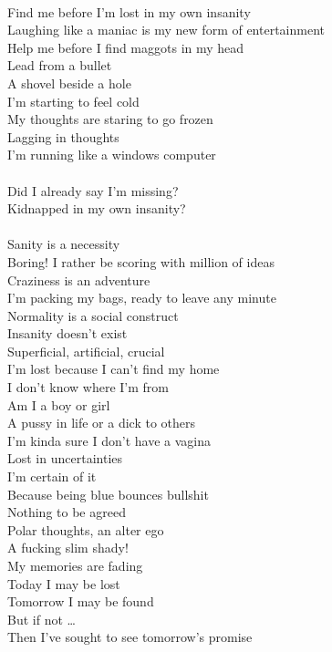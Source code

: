 \documentclass[12pt, b5paper, oneside]{book}
\begin{document}
\\Find me before I'm lost in my own insanity
\\Laughing like a maniac is my new form of entertainment
\\Help me before I find maggots in my head
\\Lead from a bullet
\\A shovel beside a hole
\\I'm starting to feel cold
\\My thoughts are staring to go frozen
\\Lagging in thoughts
\\I'm running like a windows computer
%
\\\\Did I already say I'm missing?
\\Kidnapped in my own insanity?
%
\\\\Sanity is a necessity
\\Boring! I rather be scoring with million of ideas
\\Craziness is an adventure
\\I'm packing my bags, ready to leave any minute
\\Normality is a social construct
\\Insanity doesn't exist
\\Superficial, artificial, crucial
\\I'm lost because I can't find my home
\\I don't know where I'm from
\\Am I a boy or girl
\\A pussy in life or a dick to others
\\I'm kinda sure I don't have a vagina
\\Lost in uncertainties
\\I'm certain of it
\\Because being blue bounces bullshit
\\Nothing to be agreed
\\Polar thoughts, an alter ego
\\A fucking slim shady!
\\My memories are fading
\\Today I may be lost
\\Tomorrow I may be found
\\But if not \dots 
\\Then I've sought to see tomorrow's promise 
\newpage 
\end{document}
